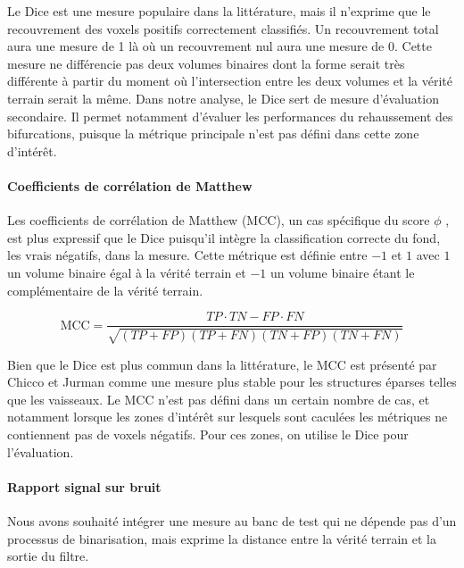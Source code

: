 Le Dice est une mesure populaire dans la littérature, mais il n'exprime que le recouvrement des voxels positifs correctement classifiés. Un recouvrement total aura une mesure de 1 là où un recouvrement nul aura une mesure de 0. 
Cette mesure ne différencie pas deux volumes binaires dont la forme serait très différente à partir du moment où l'intersection entre les deux volumes et la vérité terrain serait la même. Dans notre analyse, le Dice sert de mesure d'évaluation secondaire. Il permet notamment d'évaluer les performances du rehaussement des bifurcations, puisque la métrique principale n'est pas défini dans cette zone d'intérêt.

\paragraph{Coefficients de corrélation de Matthew}

Les coefficients de corrélation de Matthew (MCC), un cas spécifique du score $\phi$ \cite{Chicco2020_advantages_MCC_Dice}, est plus  expressif que le Dice puisqu'il intègre la classification correcte du fond, les vrais négatifs, dans la mesure. Cette métrique est définie entre $-1$ et $1$ avec $1$ un volume binaire égal à la vérité terrain et $-1$ un volume binaire étant le complémentaire de la vérité terrain.

\begin{equation}
  \textrm{MCC} = \frac{TP \cdot TN - FP \cdot FN}{\sqrt{(TP+FP)(TP+FN)(TN+FP)(TN+FN)}}
\end{equation}

Bien que le Dice est plus commun dans la littérature, le MCC est présenté par Chicco et Jurman \cite{Chicco2020_advantages_MCC_Dice} comme une mesure plus stable pour les structures éparses telles que les vaisseaux. Le MCC n'est pas défini dans un certain nombre de cas, et notamment lorsque les zones d'intérêt sur lesquels sont caculées les métriques ne contiennent pas de voxels négatifs. Pour ces zones, on utilise le Dice pour l'évaluation. 


\paragraph{Rapport signal sur bruit}


Nous avons souhaité intégrer une mesure au banc de test qui ne dépende pas d'un processus de binarisation, mais exprime la distance entre la vérité terrain et la sortie du filtre.

